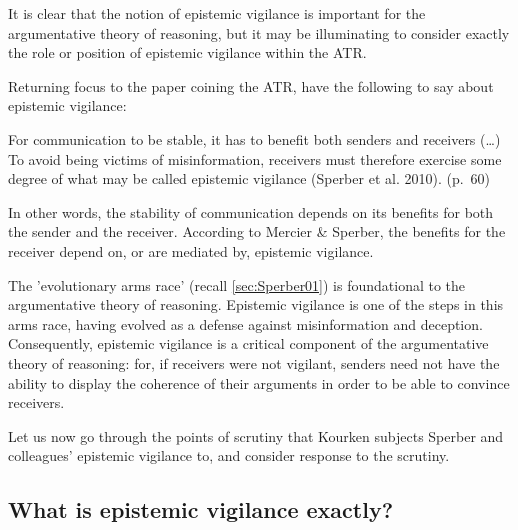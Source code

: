 It is clear that the notion of epistemic vigilance is important for the argumentative theory of reasoning, but it may be illuminating to consider exactly the role or position of epistemic vigilance within the ATR.

Returning focus to the paper coining the ATR, \citet{MS11} have the following to say about epistemic vigilance:

\begin{quoting}
    For communication to be stable, it has to benefit both senders and receivers (\ldots) To avoid being victims of misinformation, receivers must therefore exercise some degree of what may be called epistemic vigilance (Sperber et al. 2010).
\hfill (p.~60)
\end{quoting}
In other words, the stability of communication depends on its benefits for both the sender and the receiver. According to Mercier \& Sperber, the benefits for the receiver depend on, or are mediated by, epistemic vigilance.

The 'evolutionary arms race' (recall \cref{sec:Sperber01}) is foundational to the argumentative theory of reasoning. Epistemic vigilance is one of the steps in this arms race, having evolved as a defense against misinformation and deception. Consequently, epistemic vigilance is a critical component of the argumentative theory of reasoning: for, if receivers were not vigilant, senders need not have the ability to display the coherence of their arguments in order to be able to convince receivers.

Let us now go through the points of scrutiny that Kourken \citet{Michaelian13} subjects Sperber and colleagues' epistemic vigilance to, and consider  response to the scrutiny.

\subsection{What is epistemic vigilance exactly?}

